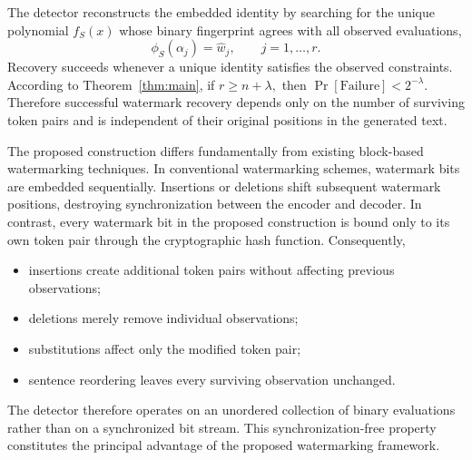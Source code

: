 \documentclass[a4paper,11pt]{llncs}
\begin{document}
The detector reconstructs the embedded identity by searching for the
unique polynomial $f_S(x)$
whose binary fingerprint agrees with all observed evaluations,
\[
\phi_S(\alpha_j)
=
\hat w_j,
\qquad
j=1,\ldots,r.
\]
Recovery succeeds whenever a unique identity satisfies the observed
constraints.
According to Theorem~\ref{thm:main}, if
$r
\ge
n+\lambda,$
then 
$\Pr[\mathrm{Failure}]
<
2^{-\lambda}.$
Therefore successful watermark recovery depends only on the number of
surviving token pairs and is independent of their original positions in
the generated text.


The proposed construction differs fundamentally from existing
block-based watermarking techniques.
In conventional watermarking schemes, watermark bits are embedded
sequentially.
Insertions or deletions shift subsequent watermark positions,
destroying synchronization between the encoder and decoder.
In contrast, every watermark bit in the proposed construction is bound
only to its own token pair through the cryptographic hash function.
Consequently,
%
\begin{itemize}

\item insertions create additional token pairs without affecting
previous observations;
\item deletions merely remove individual observations;
\item substitutions affect only the modified token pair;
\item sentence reordering leaves every surviving observation unchanged.
\end{itemize}
%
The detector therefore operates on an unordered collection of binary
evaluations rather than on a synchronized bit stream.
This synchronization-free property constitutes the principal advantage
of the proposed watermarking framework.


\end{document}
